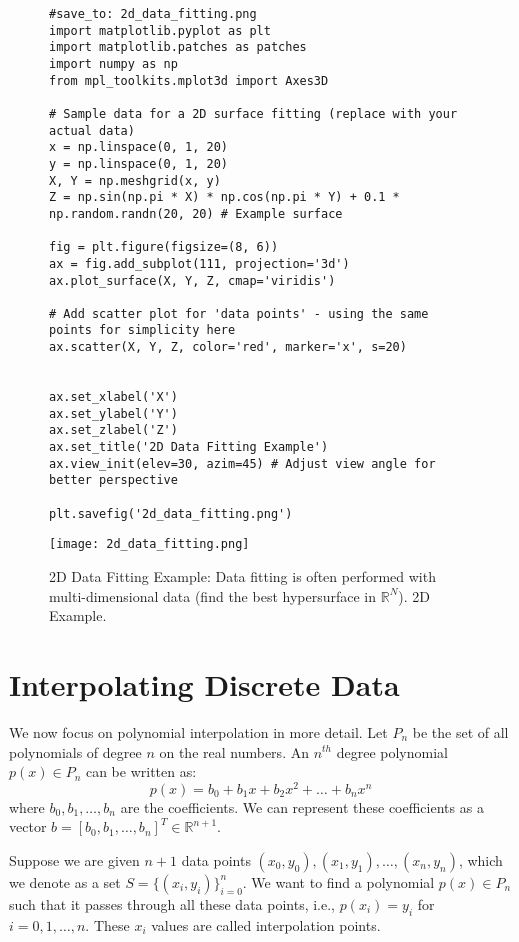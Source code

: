 \documentclass{article}
\begin{document}
\begin{figure}[h]
    \centering
    \begin{verbatim}
#save_to: 2d_data_fitting.png
import matplotlib.pyplot as plt
import matplotlib.patches as patches
import numpy as np
from mpl_toolkits.mplot3d import Axes3D

# Sample data for a 2D surface fitting (replace with your actual data)
x = np.linspace(0, 1, 20)
y = np.linspace(0, 1, 20)
X, Y = np.meshgrid(x, y)
Z = np.sin(np.pi * X) * np.cos(np.pi * Y) + 0.1 * np.random.randn(20, 20) # Example surface

fig = plt.figure(figsize=(8, 6))
ax = fig.add_subplot(111, projection='3d')
ax.plot_surface(X, Y, Z, cmap='viridis')

# Add scatter plot for 'data points' - using the same points for simplicity here
ax.scatter(X, Y, Z, color='red', marker='x', s=20)


ax.set_xlabel('X')
ax.set_ylabel('Y')
ax.set_zlabel('Z')
ax.set_title('2D Data Fitting Example')
ax.view_init(elev=30, azim=45) # Adjust view angle for better perspective

plt.savefig('2d_data_fitting.png')
    \end{verbatim}
    \texttt{[image: 2d\_data\_fitting.png]}
    \caption{2D Data Fitting Example: Data fitting is often performed with multi-dimensional data (find the best hypersurface in $\mathbb{R}^N$). 2D Example.}
    \label{fig:2d_data_fitting}
\end{figure}

\section{Interpolating Discrete Data}

We now focus on polynomial interpolation in more detail. Let $P_n$ be the set of all polynomials of degree $n$ on the real numbers. An $n^{th}$ degree polynomial $p(x) \in P_n$ can be written as:
\[ p(x) = b_0 + b_1 x + b_2 x^2 + \dots + b_n x^n \]
where $b_0, b_1, \dots, b_n$ are the coefficients. We can represent these coefficients as a vector $b = [b_0, b_1, \dots, b_n]^T \in \mathbb{R}^{n+1}$.

Suppose we are given $n+1$ data points $(x_0, y_0), (x_1, y_1), \dots, (x_n, y_n)$, which we denote as a set $S = \{(x_i, y_i)\}_{i=0}^n$. We want to find a polynomial $p(x) \in P_n$ such that it passes through all these data points, i.e., $p(x_i) = y_i$ for $i = 0, 1, \dots, n$. These $x_i$ values are called interpolation points.
\end{document}
